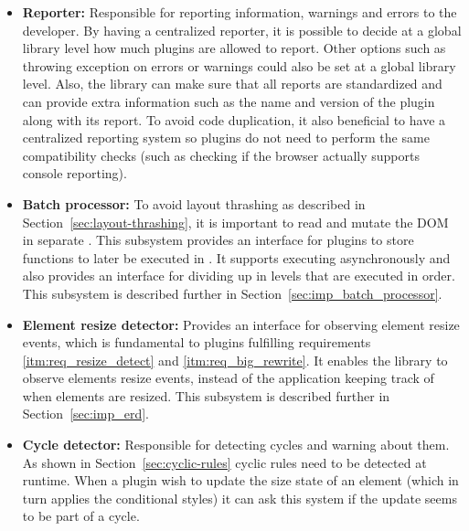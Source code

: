 \documentclass[a4paper,11pt]{kth-mag}
\begin{document}
      \begin{itemize}
        \item \textbf{Reporter:}
          Responsible for reporting information, warnings and errors to the developer.
          By having a centralized reporter, it is possible to decide at a global library level how much plugins are allowed to report.
          Other options such as throwing exception on errors or warnings could also be set at a global library level.
          Also, the library can make sure that all reports are standardized and can provide extra information such as the name and version of the plugin along with its report.
          To avoid code duplication, it also beneficial to have a centralized reporting system so plugins do not need to perform the same compatibility checks (such as checking if the \gls{browser} actually supports console reporting).
        \item \textbf{Batch processor:}
          To avoid \gls{layout thrashing} as described in Section~\ref{sec:layout-thrashing}, it is important to read and mutate the \gls{DOM} in separate .
          This subsystem provides an interface for plugins to store functions to later be executed in .
          It supports executing  asynchronously and also provides an interface for dividing  up in levels that are executed in order.
          This subsystem is described further in Section~\ref{sec:imp_batch_processor}.
        \item \textbf{Element resize detector:}
          Provides an interface for observing \gls{element} resize events, which is fundamental to plugins fulfilling requirements \ref{itm:req_resize_detect} and \ref{itm:req_big_rewrite}.
          It enables the library to observe \glspl{element} resize events, instead of the application keeping track of when \glspl{element} are resized.
          This subsystem is described further in Section~\ref{sec:imp_erd}.
        \item \textbf{Cycle detector:}
          Responsible for detecting cycles and warning about them.
          As shown in Section~\ref{sec:cyclic-rules} cyclic rules need to be detected at runtime.
          When a plugin wish to update the size state of an \gls{element} (which in turn applies the conditional styles) it can ask this system if the update seems to be part of a cycle.

\end{itemize}
\end{document}
